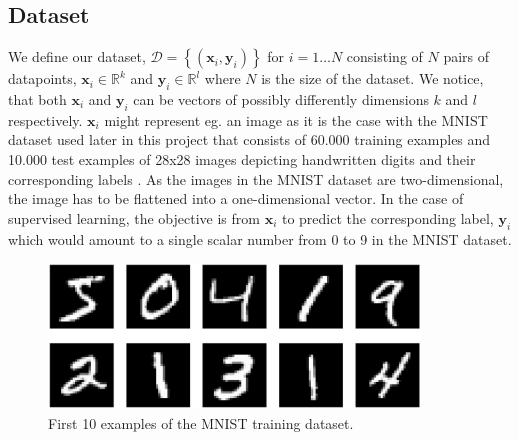 \documentclass[a4paper,11pt]{article} %
\begin{document}
\subsection{Dataset}
We define our dataset, $\mathcal{D} = \left\{(\mathbf{x}_i, \mathbf{y}_i)\right\}$ for $i = 1 \ldots N$ consisting of $N$ pairs of datapoints, $\mathbf{x}_i \in \mathbb{R}^k$ and $\mathbf{y}_i \in \mathbb{R}^l$ where $N$ is the size of the dataset. We notice, that both $\mathbf{x}_i$ and $\mathbf{y}_i$ can be vectors of possibly differently dimensions $k$ and $l$ respectively. $\mathbf{x}_i$ might represent eg. an image as it is the case with the MNIST dataset used later in this project that consists of 60.000 training examples and 10.000 test examples of 28x28 images depicting handwritten digits and their corresponding labels \cite{mnist}. As the images in the MNIST dataset are two-dimensional, the image has to be flattened into a one-dimensional vector. In the case of supervised learning, the objective is from $\mathbf{x}_i$ to predict the corresponding label, $\mathbf{y}_i$ which would amount to a single scalar number from 0 to 9 in the MNIST dataset. 
\begin{figure}[ht]
  \centering
  \includegraphics[width=280pt]{graphics/mnist.png}  
  \caption{First 10 examples of the MNIST training dataset.}
  \label{fig:MNIST}
\end{figure}



\end{document}
